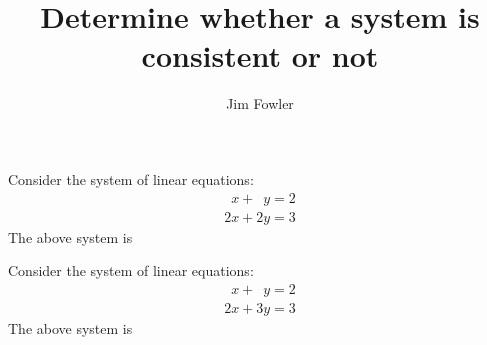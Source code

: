 \documentclass{ximera}
\title{Determine whether a system is consistent or not}
\author{Jim Fowler}
\begin{document}
\begin{problem}
  Consider the system of linear equations:
  \begin{align*}
    \phantom{2}x + \phantom{2}y = 2 \\
    2x + 2y = 3
  \end{align*}
  The above system is
  \begin{multipleChoice}
  \end{multipleChoice}
\end{problem}

\begin{problem}
  Consider the system of linear equations:
  \begin{align*}
    \phantom{2}x + \phantom{2}y = 2 \\
    2x + 3y = 3
  \end{align*}
  The above system is
  \begin{multipleChoice}
  \end{multipleChoice}
\end{problem}
\end{document}
